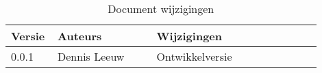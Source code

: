 \begin{flushleft}
\begin{table}[h!]
\centering
	\begin{tabularx}{\textwidth}{ |p{0.1\linewidth}|p{0.3\linewidth}|p{0.5\linewidth}| }
\hline
	Versie &
	Auteurs &
	Wijzigingen\\
\hline
	0.0.1 &
	Dennis Leeuw &
	Ontwikkelversie\\
\hline
\hline
\end{tabularx}
\caption{Document wijzigingen}
\label{table:1}
\end{table}
\end{flushleft}

